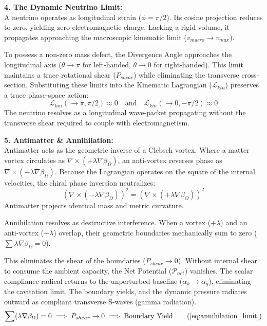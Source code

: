 \textbf{4. The Dynamic Neutrino Limit:} \\
A neutrino operates as longitudinal strain ($\phi = \pi/2$). Its cosine projection reduces to zero, yielding zero electromagnetic charge. Lacking a rigid volume, it propagates approaching the macroscopic kinematic limit ($v_{macro} \to v_{max}$).

To possess a non-zero mass defect, the Divergence Angle approaches the longitudinal axis ($\theta \to \pi$ for left-handed, $\theta \to 0$ for right-handed). This limit maintains a trace rotational shear ($P_{shear}$) while eliminating the transverse cross-section. Substituting these limits into the Kinematic Lagrangian ($\mathcal{L}_{kin}$) preserves a trace phase-space action: 
\begin{equation}
    \mathcal{L}_{kin}(\to \pi, \pi/2) \approx 0 \quad \text{and} \quad \mathcal{L}_{kin}(\to 0, -\pi/2) \approx 0 \nonumber
\end{equation}
The neutrino resolves as a longitudinal wave-packet propagating without the transverse shear required to couple with electromagnetism. 
\vspace{0.2 cm}

\textbf{5. Antimatter \& Annihilation:} \\ 
Antimatter acts as the geometric inverse of a Clebsch vortex. Where a matter vortex circulates as $\nabla \times (+\lambda \nabla \beta_\Omega)$, an anti-vortex reverses phase as $\nabla \times (-\lambda \nabla \beta_\Omega)$. Because the Lagrangian operates on the square of the internal velocities, the chiral phase inversion neutralizes: 
\begin{equation}
    (\nabla \times (-\lambda \nabla \beta_\Omega))^2 = (\nabla \times (+\lambda \nabla \beta_\Omega))^2 \nonumber
\end{equation}
Antimatter projects identical mass and metric curvature. 

Annihilation resolves as destructive interference. When a vortex ($+\lambda$) and an anti-vortex ($-\lambda$) overlap, their geometric boundaries mechanically sum to zero ($\sum \lambda \nabla \beta_\Omega = 0$). 

This eliminates the shear of the boundaries ($P_{shear} \to 0$). Without internal shear to consume the ambient capacity, the Net Potential ($\mathcal{P}_{net}$) vanishes. The scalar compliance radical returns to the unperturbed baseline ($\alpha_k \to \alpha_g$), eliminating the cavitation limit. The boundary yields, and the dynamic pressure radiates outward as compliant transverse S-waves (gamma radiation).
\begin{equation}
    \sum (\lambda \nabla \beta_\Omega) = 0 \implies P_{shear} \to 0 \implies \text{Boundary Yield} \tag{\ref{eq:annihilation_limit}} 
\end{equation}


